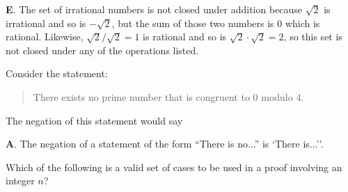 \documentclass[addpoints]{exam}
\begin{document}
\begin{questions}
	\begin{solution}
		\textbf{E}. The set of irrational numbers is not closed under addition because $\sqrt{2}$ is irrational and so is $-\sqrt{2}$, but the sum of those two numbers is $0$ which is rational. Likewise, $\sqrt{2}/\sqrt{2} = 1$ is rational and so is $\sqrt{2} \cdot \sqrt{2} = 2$, so this set is not closed under any of the operations listed.  
	\end{solution}
	

\question[2] Consider the statement: 
			\begin{quote}
				There exists no prime number that is congruent to $0$ modulo $4$. 
			\end{quote}
		The negation of this statement would say

		\begin{solution}
			\textbf{A}. The negation of a statement of the form ``There is no...'' is `There is...''.  
		\end{solution}


\question[2] Which of the following is a valid set of cases to be used in a proof involving an integer $n$?
\end{questions}
\end{document}
